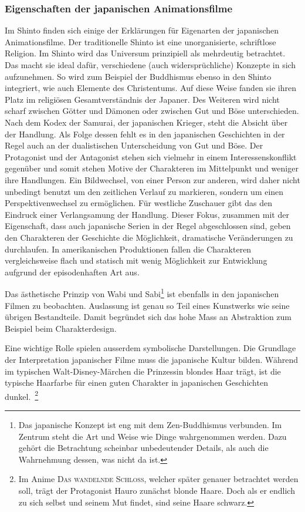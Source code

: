 \subsubsection{Eigenschaften der japanischen Animationsfilme}
Im Shinto finden sich einige der Erklärungen für Eigenarten der japanischen Animationsfilme. Der traditionelle Shinto ist eine unorganisierte, schriftlose Religion. Im Shinto wird das Universum prinzipiell als mehrdeutig betrachtet. Das macht sie ideal dafür, verschiedene (auch widersprüchliche) Konzepte in sich aufzunehmen. So wird zum Beispiel der Buddhismus ebenso in den Shinto integriert, wie auch Elemente des Christentums. Auf diese Weise fanden sie ihren Platz im religiösen Gesamtverständnis der Japaner. Des Weiteren wird nicht scharf zwischen Götter und Dämonen oder zwischen Gut und Böse unterschieden. Nach dem Kodex der Samurai, der japanischen Krieger, steht die Absicht über der Handlung. Als Folge dessen fehlt es in den japanischen Geschichten in der Regel auch an der dualistischen Unterscheidung von Gut und Böse. Der Protagonist und der Antagonist stehen sich vielmehr in einem Interessenskonflikt gegenüber und somit stehen Motive der Charakteren im Mittelpunkt und weniger ihre Handlungen. Ein Bildwechsel, von einer Person zur anderen, wird daher nicht unbedingt benutzt um den zeitlichen Verlauf zu markieren, sondern um einen Perspektivenwechsel zu ermöglichen. Für westliche Zuschauer gibt das den Eindruck einer Verlangsamung der Handlung. Dieser Fokus, zusammen mit der Eigenschaft, dass auch japanische Serien in der Regel abgeschlossen sind, geben den Charakteren der Geschichte die Möglichkeit, dramatische Veränderungen zu durchlaufen. In amerikanischen Produktionen fallen die Charakteren vergleichsweise flach und statisch mit wenig Möglichkeit zur Entwicklung aufgrund der episodenhaften Art aus. 

Das ästhetische Prinzip von Wabi und Sabi\footnote{Das japanische Konzept ist eng mit dem Zen-Buddhismus verbunden. Im Zentrum steht die Art und Weise wie Dinge wahrgenommen werden. Dazu gehört die Betrachtung scheinbar unbedeutender Details, als auch die Wahrnehmung dessen, was nicht da ist.} ist ebenfalls in den japanischen Filmen zu beobachten. Auslassung ist genau so Teil eines Kunstwerks wie seine übrigen Bestandteile. Damit begründet sich das hohe Mass an Abstraktion zum Beispiel beim Charakterdesign.
 
Eine wichtige Rolle spielen ausserdem symbolische Darstellungen. Die Grundlage der Interpretation japanischer Filme muss die japanische Kultur bilden. Während im typischen Walt-Disney-Märchen die Prinzessin blondes Haar trägt, ist die typische Haarfarbe für einen guten Charakter in japanischen Geschichten dunkel.~\footnote{Im Anime \textsc{Das wandelnde Schloss}, welcher später genauer betrachtet werden soll, trägt der Protagonist Hauro zunächst blonde Haare. Doch als er endlich zu sich selbst und seinem Mut findet, sind seine Haare schwarz.}

